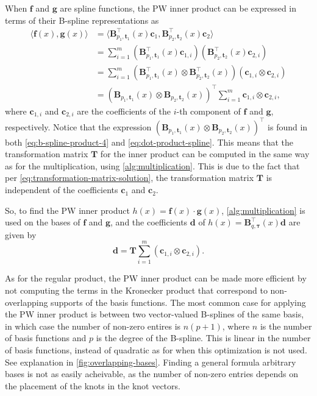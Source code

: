When $\mathbf f$ and $\mathbf g$ are spline functions, the PW inner product can be expressed in terms of their B-spline representations as
\begin{equation}
    \label{eq:dot-product-spline}
    \begin{aligned}
        \langle\mathbf f(x), \mathbf g(x)\rangle &= \langle\mathbf B_{p_1, \mathbf t_1}^\top(x) \mathbf c_1, \mathbf B_{p_2, \mathbf t_2}^\top(x) \mathbf c_2\rangle \\
        &= \sum_{i=1}^m \left(\mathbf B_{p_1, \mathbf t_1}^\top(x) \mathbf c_{1,i}\right) \left(\mathbf B_{p_2, \mathbf t_2}^\top(x) \mathbf c_{2,i}\right) \\
        &= \sum_{i=1}^m \left(\mathbf B_{p_1, \mathbf t_1}^\top(x) \otimes \mathbf B_{p_2, \mathbf t_2}^\top(x)\right) \left(\mathbf c_{1,i} \otimes \mathbf c_{2,i}\right) \\
        &= \left(\mathbf B_{p_1, \mathbf t_1}(x) \otimes \mathbf B_{p_2, \mathbf t_2}(x)\right)^{\top} \sum_{i=1}^m \mathbf c_{1,i} \otimes \mathbf c_{2,i},
    \end{aligned}
\end{equation}
where $\mathbf c_{1,i}$ and $\mathbf c_{2,i}$ are the coefficients of the $i$-th component of $\mathbf f$ and $\mathbf g$, respectively. Notice that the expression $\left(\mathbf B_{p_1, \mathbf t_1}(x) \otimes \mathbf B_{p_2, \mathbf t_2}(x)\right)^{\top}$ is found in both \cref{eq:b-spline-product-4} and \cref{eq:dot-product-spline}. This means that the transformation matrix $\mathbf T$ for the inner product can be computed in the same way as for the multiplication, using \cref{alg:multiplication}.
This is due to the fact that per \cref{eq:transformation-matrix-solution}, the transformation matrix $\mathbf T$ is independent of the coefficients $\mathbf c_{1}$ and $\mathbf c_{2}$.

So, to find the PW inner product $h(x) = \mathbf f(x) \cdot \mathbf g(x)$, \cref{alg:multiplication} is used on the bases of $\mathbf f$ and $\mathbf g$, and the coefficients $\mathbf d$ of $h(x) = \mathbf B_{q, \boldsymbol{\tau}}^\top(x) \mathbf d$ are given by
\begin{equation}
    \mathbf d = \mathbf T \sum_{i=1}^m (\mathbf c_{1,i} \otimes \mathbf c_{2,i}).
\end{equation}

As for the regular product, the PW inner product can be made more efficient by not computing the terms in the Kronecker product that correspond to non-overlapping supports of the basis functions. The most common case for applying the PW inner product is between two vector-valued B-splines of the same basis, in which case the number of non-zero entires is $n(p+1)$, where $n$ is the number of basis functions and $p$ is the degree of the B-spline. This is linear in the number of basis functions, instead of quadratic as for when this optimization is not used. See explanation in \cref{fig:overlapping-bases}. Finding a general formula arbitrary bases is not as easily acheivable, as the number of non-zero entries depends on the placement of the knots in the knot vectors.

